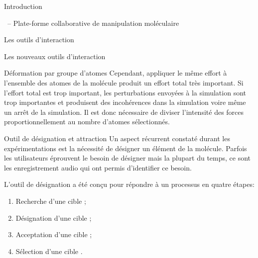\documentclass[myfrancais]{mythesis}
\begin{document}
\begin{mypart}{Introduction}
\begin{mychapter}{\myShaddock\ -- Plate-forme collaborative de manipulation moléculaire}
\begin{mysection}{Les outils d'interaction}
\begin{mysubsection}{Les nouveaux outils d'interaction}
\begin{mysubsubsection}{Déformation par groupe d'atomes}
						Cependant, appliquer le même effort à l'ensemble des atomes de la molécule produit un effort total très important.
						Si l'effort total est trop important, les perturbations envoyées à la simulation sont trop importantes et produisent des incohérences dans la simulation voire même un arrêt de la simulation.
						Il est donc nécessaire de diviser l'intensité des forces proportionnellement au nombre d'atomes sélectionnés.
					\end{mysubsubsection}
					\begin{mysubsubsection}{Outil de désignation et attraction}
						Un aspect récurrent constaté durant les expérimentations est la nécessité de désigner un élément de la molécule.
						Parfois les utilisateurs éprouvent le besoin de désigner mais la plupart du temps, ce sont les enregistrement audio qui ont permis d'identifier ce besoin.

						L'outil de désignation a été conçu pour répondre à un processus en quatre étapes:
						\begin{enumerate}[label={\alph*.},ref={\alph*}]
							\item Recherche d'une cible ;\label{enu-designation-RechercheDUneCible}
							\item Désignation d'une cible ;\label{enu-designation-DesignationDUneCible}
							\item Acceptation d'une cible ;\label{enu-designation-AcceptationDUneCible}
							\item Sélection d'une cible .\label{enu-designation-SelectionDUneCible}
						\end{enumerate}


\end{mysubsubsection}
\end{mysubsection}
\end{mysection}
\end{mychapter}
\end{mypart}
\end{document}
